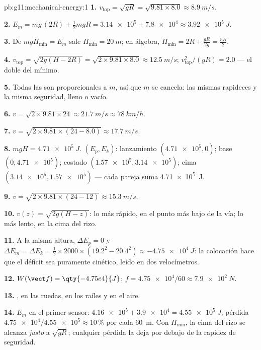 \begin{solution}{pb:g11:mechanical-energy:1}
\textbf{1.} $v_{\text{top}} = \sqrt{gR} = \sqrt{9.81 \times 8.0}
\approx \qty{8.9}{m/s}$.

\textbf{2.} $E_m = mg\,(2R) + \tfrac12 m gR = \num{3.14e5} +
\num{7.8e4} \approx \qty{3.92e5}{J}$.

\textbf{3.} De $mgH_{\min} = E_m$ sale $H_{\min} = \qty{20}{m}$; en
álgebra, $H_{\min} = 2R + \frac{gR}{2g} = \frac{5R}{2}$.

\textbf{4.} $v_{\text{top}} = \sqrt{2g(H - 2R)} =
\sqrt{2 \times 9.81 \times 8.0} \approx \qty{12.5}{m/s}$;
$v_{\text{top}}^2/(gR) = 2.0$ --- el doble del mínimo.

\textbf{5.} Todas las  son proporcionales a $m$, así que $m$ se
cancela: las mismas rapideces y la misma seguridad, lleno o vacío.

\textbf{6.} $v = \sqrt{2 \times 9.81 \times 24} \approx \qty{21.7}{m/s}
\approx \qty{78}{km/h}$.

\textbf{7.} $v = \sqrt{2 \times 9.81 \times (24 - 8.0)} \approx
\qty{17.7}{m/s}$.

\textbf{8.} $mgH = \qty{4.71e5}{J}$. $(E_p, E_k)$: lanzamiento
$(\num{4.71e5}, 0)$; base $(0, \num{4.71e5})$; costado
$(\num{1.57e5}, \num{3.14e5})$; cima
$(\num{3.14e5}, \num{1.57e5})$ --- cada pareja suma \qty{4.71e5}{J}.

\textbf{9.} $v = \sqrt{2 \times 9.81 \times (24 - 12)} \approx
\qty{15.3}{m/s}$.

\textbf{10.} $v(z) = \sqrt{2g(H - z)}$: lo más rápido, en el punto más
bajo de la vía; lo más lento, en la cima del rizo.

\textbf{11.} A la misma altura, $\Delta E_p = 0$ y
$\Delta E_m = \Delta E_k = \tfrac12 \times 2000 \times (19.2^2 -
20.4^2) \approx \qty{-4.75e4}{J}$: la colocación hace que el déficit sea
puramente cinético, leído en dos velocímetros.

\textbf{12.} $W(\vect f) = \qty{-4.75e4}{J}$;
$f = \num{4.75e4}/60 \approx \qty{7.9e2}{N}$.

\textbf{13.} , en las ruedas, en los raíles y en el aire.

\textbf{14.} $E_m$ en el primer sensor:
$\num{4.16e5} + \num{3.9e4} = \qty{4.55e5}{J}$; pérdida
$\num{4.75e4}/\num{4.55e5} \approx 10\,\%$ por cada \qty{60}{m}. Con
$H_{\min}$, la cima del rizo se alcanza \emph{justo} a $\sqrt{gR}$;
cualquier pérdida la deja por debajo de la rapidez de seguridad.


\end{solution}
